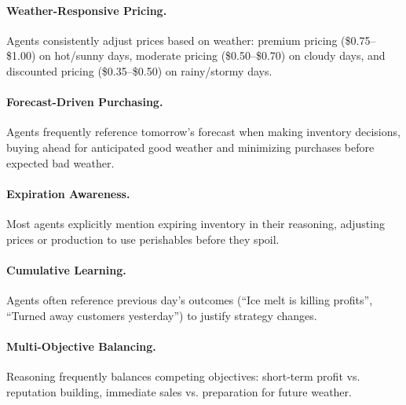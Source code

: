 \paragraph{Weather-Responsive Pricing.}
Agents consistently adjust prices based on weather: premium pricing (\$0.75--\$1.00) on hot/sunny days, moderate pricing (\$0.50--\$0.70) on cloudy days, and discounted pricing (\$0.35--\$0.50) on rainy/stormy days.

\paragraph{Forecast-Driven Purchasing.}
Agents frequently reference tomorrow's forecast when making inventory decisions, buying ahead for anticipated good weather and minimizing purchases before expected bad weather.

\paragraph{Expiration Awareness.}
Most agents explicitly mention expiring inventory in their reasoning, adjusting prices or production to use perishables before they spoil.

\paragraph{Cumulative Learning.}
Agents often reference previous day's outcomes (``Ice melt is killing profits'', ``Turned away customers yesterday'') to justify strategy changes.

\paragraph{Multi-Objective Balancing.}
Reasoning frequently balances competing objectives: short-term profit vs. reputation building, immediate sales vs. preparation for future weather.

